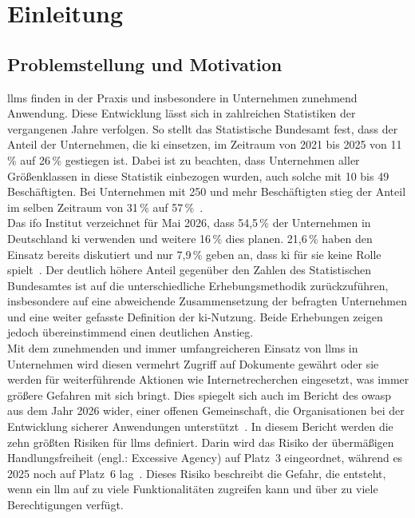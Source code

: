 \chapter{Einleitung}\label{ch:einleitung}


\section{Problemstellung und Motivation}

\acp{llm} finden in der Praxis und insbesondere in Unternehmen zunehmend Anwendung. Diese Entwicklung lässt sich in zahlreichen Statistiken der vergangenen 
Jahre verfolgen. So stellt das Statistische Bundesamt fest, dass der Anteil der Unternehmen, die \ac{ki} einsetzen, im Zeitraum von 2021 bis 2025 von 
11\,\% auf 26\,\% gestiegen ist. Dabei ist zu beachten, dass Unternehmen aller Größenklassen in diese Statistik einbezogen wurden, auch solche mit 10 bis 
49 Beschäftigten. Bei Unternehmen mit 250 und mehr Beschäftigten stieg der Anteil im selben Zeitraum von 31\,\% auf 57\,\%~\cite{e01}. \\
Das ifo Institut verzeichnet für Mai 2026, dass 54,5\,\% der Unternehmen in Deutschland \ac{ki} verwenden und weitere 16\,\% dies planen. 21,6\,\% haben den Einsatz
bereits diskutiert und nur 7,9\,\% geben an, dass \ac{ki} für sie keine Rolle spielt~\cite{e02}. Der deutlich höhere Anteil gegenüber den Zahlen des 
Statistischen Bundesamtes ist auf die unterschiedliche Erhebungsmethodik zurückzuführen, insbesondere auf eine abweichende Zusammensetzung der befragten Unternehmen
und eine weiter gefasste Definition der \ac{ki}-Nutzung. Beide Erhebungen zeigen jedoch übereinstimmend einen deutlichen Anstieg. \\
Mit dem zunehmenden und immer umfangreicheren Einsatz von \acp{llm} in Unternehmen wird diesen vermehrt Zugriff auf Dokumente gewährt oder sie werden für weiterführende 
Aktionen wie Internetrecherchen eingesetzt, was immer größere Gefahren mit sich bringt.
Dies spiegelt sich auch im Bericht des \ac{owasp} aus dem Jahr 2026 wider, einer offenen Gemeinschaft, die Organisationen bei der 
Entwicklung sicherer Anwendungen unterstützt~\cite{pi25}. In diesem Bericht werden die zehn größten Risiken für \acp{llm} definiert. Darin wird
das Risiko der übermäßigen Handlungsfreiheit (engl.: Excessive Agency) auf Platz~3 eingeordnet, während es 2025 noch auf Platz~6 lag~\cite{pi24}. Dieses Risiko beschreibt die Gefahr, die 
entsteht, wenn ein \ac{llm} auf zu viele Funktionalitäten zugreifen kann und über zu viele Berechtigungen verfügt. \\
